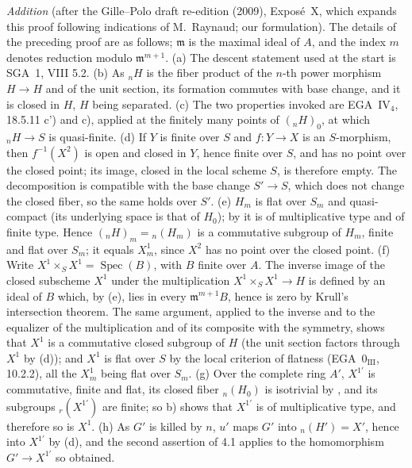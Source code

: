 \par\medskip\noindent
\emph{Addition} (after the Gille--Polo draft re-edition (2009), Expos\'e~X,
which expands this proof following indications of M.~Raynaud; our
formulation). The details of the preceding proof are as follows; \(\mathfrak
m\) is the maximal ideal of \(A\), and the index \(m\) denotes reduction
modulo \(\mathfrak m^{m+1}\). (a) The descent statement used at the start is
SGA~1, VIII 5.2. (b) As \({}_nH\) is the fiber product of the \(n\)-th power
morphism \(H\to H\) and of the unit section, its formation commutes with base
change, and it is closed in \(H\), \(H\) being separated. (c) The two
properties invoked are EGA~IV\(_4\), 18.5.11 c') and c), applied at the
finitely many points of \(({}_nH)_0\), at which \({}_nH\to S\) is
quasi-finite. (d) If \(Y\) is finite over \(S\) and \(f\colon Y\to X\) is an
\(S\)-morphism, then \(f^{-1}(X^2)\) is open and closed in \(Y\), hence finite
over \(S\), and has no point over the closed point; its image, closed in the
local scheme \(S\), is therefore empty. The decomposition is compatible with
the base change \(S'\to S\), which does not change the closed fiber, so the
same holds over \(S'\). (e) \(H_m\) is flat over \(S_m\) and quasi-compact
(its underlying space is that of \(H_0\)); by  it is of multiplicative
type and of finite type. Hence \(({}_nH)_m={}_n(H_m)\) is a commutative
subgroup of \(H_m\), finite and flat over \(S_m\); it equals \(X^1_m\), since
\(X^2\) has no point over the closed point. (f) Write \(X^1\times_SX^1
=\operatorname{Spec}(B)\), with \(B\) finite over \(A\). The inverse image of
the closed subscheme \(X^1\) under the multiplication
\(X^1\times_SX^1\to H\) is defined by an ideal of \(B\) which, by (e), lies
in every \(\mathfrak m^{m+1}B\), hence is zero by Krull's intersection
theorem. The same argument, applied to the inverse and to the equalizer of the
multiplication and of its composite with the symmetry, shows that \(X^1\) is a
commutative closed subgroup of \(H\) (the unit section factors through \(X^1\)
by (d)); and \(X^1\) is flat over \(S\) by the local criterion of flatness
(EGA~\(0_{\mathrm{III}}\), 10.2.2), all the \(X^1_m\) being flat over \(S_m\).
(g) Over the complete ring \(A'\), \(X^{1\prime}\) is commutative, finite and
flat, its closed fiber \({}_n(H_0)\) is isotrivial by , and its
subgroups \({}_r(X^{1\prime})\) are finite; so  b) shows that
\(X^{1\prime}\) is of multiplicative type, and therefore so is \(X^1\). (h) As
\(G'\) is killed by \(n\), \(u'\) maps \(G'\) into \({}_n(H')=X'\), hence into
\(X^{1\prime}\) by (d), and the second assertion of 4.1 applies to the
homomorphism \(G'\to X^{1\prime}\) so obtained.

